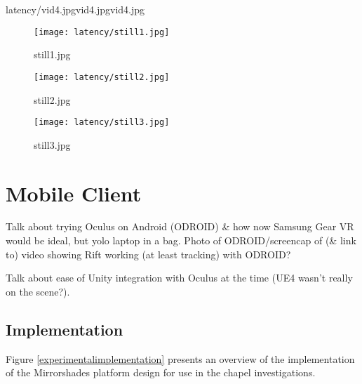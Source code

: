        {latency/vid4.jpg}{vid4.jpg}{vid4.jpg}

\begin{figure}[h]
    \begin{center}
    \begin{minipage}{.32\textwidth}
        \begin{center}
        \texttt{[image: latency/still1.jpg]}
        \caption{still1.jpg}
        \label{still1.jpg}
        \end{center}
    \end{minipage}%
    \hspace{.01\textwidth}
    \begin{minipage}{.32\textwidth}
		\begin{center}
        \texttt{[image: latency/still2.jpg]}
        \caption{still2.jpg}
        \label{still2.jpg}
        \end{center}
    \end{minipage}%
    \hspace{.01\textwidth}
    \begin{minipage}{.32\textwidth}
        \begin{center}
        \texttt{[image: latency/still3.jpg]}
        \caption{still3.jpg}
        \label{still3.jpg}
        \end{center}
    \end{minipage}
    \end{center}
\end{figure}


\section{Mobile Client}

Talk about trying Oculus on Android (ODROID) \& how now Samsung Gear VR would be ideal, but yolo laptop in a bag. Photo of ODROID/screencap of (\& link to) video showing Rift working (at least tracking) with ODROID?

Talk about ease of Unity integration with Oculus at the time (UE4 wasn't really on the scene?).


\subsection{Implementation}
Figure \ref{experimentalimplementation} presents an overview of the implementation of the Mirrorshades platform design for use in the chapel investigations.

